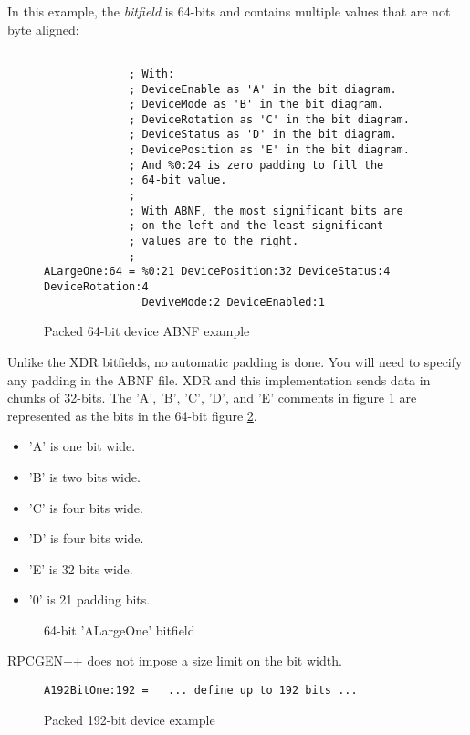 In this example, the \textit{bitfield} is 64-bits and
contains multiple values that are not byte aligned:
\begin{figure}
\begin{verbatim}

             ; With:
             ; DeviceEnable as 'A' in the bit diagram.
             ; DeviceMode as 'B' in the bit diagram.
             ; DeviceRotation as 'C' in the bit diagram.
             ; DeviceStatus as 'D' in the bit diagram.
             ; DevicePosition as 'E' in the bit diagram.
             ; And %0:24 is zero padding to fill the
             ; 64-bit value.
             ;
             ; With ABNF, the most significant bits are
             ; on the left and the least significant
             ; values are to the right.
             ;
ALargeOne:64 = %0:21 DevicePosition:32 DeviceStatus:4 DeviceRotation:4
               DeviveMode:2 DeviceEnabled:1
\end{verbatim}
\caption{Packed 64-bit device ABNF example}
\label{fig:ALargeOneABNF}
\end{figure}
Unlike the XDR bitfields, no automatic padding is done.
You will need to specify any padding in the ABNF file.
XDR and this implementation sends data in chunks of 32-bits.
The 'A', 'B', 'C', 'D', and 'E' comments in figure
\ref{fig:ALargeOneABNF} are represented as the bits in
the 64-bit figure \ref{fig:ALargeOneBitsABNF}.
\begin{itemize}
\item 'A' is one bit wide.
\item 'B' is two bits wide.
\item 'C' is four bits wide.
\item 'D' is four bits wide.
\item 'E' is 32 bits wide.
\item '0' is 21 padding bits.
\end{itemize}
\begin{figure}
  
  \caption{64-bit 'ALargeOne' bitfield}
  \label{fig:ALargeOneBitsABNF}
\end{figure}

RPCGEN++ does not impose a size limit on the bit width.

\begin{figure}
\begin{verbatim}
A192BitOne:192 =   ... define up to 192 bits ...
\end{verbatim}
\caption{Packed 192-bit device example}
\label{fig:A192BitABNF}
\end{figure}

